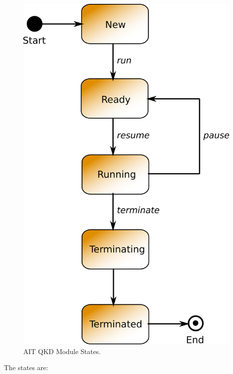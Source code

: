 \begin{figure}[h]
    \centering
    \includegraphics[scale=0.70,keepaspectratio=true]{./gfx/qkd-module-states.png}
    \caption{AIT QKD Module States.}
    \label{fig:qkd-module-states}
\end{figure}

\medskip

The states are:

